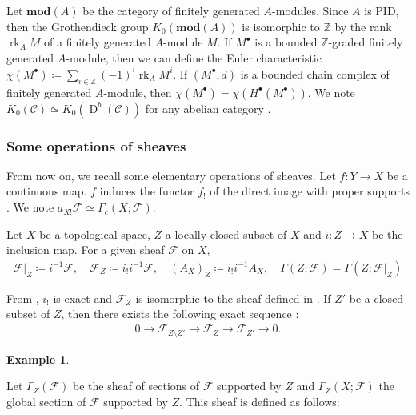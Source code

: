 \documentclass[a4paper,dvipdfmx,reqno,12pt]{amsart}
\theoremstyle{definition}
\newtheorem{example}[theorem]{Example}
\newcommand{\deq}{\coloneqq}
\newcommand{\Z}{\mathbb{Z}}%
\newcommand{\mcal}[1]{\mathcal{#1}}%
\newcommand{\opn}[1]{\operatorname{#1}}
\newcommand{\catn}[1]{\mathbf{#1}}
\numberwithin{equation}{section}
\begin{document}
Let $\catn{mod}(A)$ be the category of 
finitely generated $A$-modules.
Since $A$ is PID, then the Grothendieck group 
$K_0(\catn{mod}(A))$ is isomorphic to $\Z$ by
the rank $\opn{rk}_A M$ of a finitely generated
$A$-module $M$.
If $M^{\bullet}$ is a bounded $\Z$-graded finitely generated $A$-module,
then we can define the Euler characteristic 
$\chi(M^{\bullet})\deq 
\sum_{i\in \Z}(-1)^{i}\opn{rk}_A M^{i}$.
If $(M^{\bullet},d)$ is a bounded chain complex of finitely 
generated $A$-module, then 
$\chi(M^{\bullet})=\chi(H^{\bullet}(M^{\bullet}))$.
We note $K_0(\mathcal{C})\simeq 
K_0(\opn{D}^{b}(\mathcal{C}))$ for any abelian category 
\cite[Exercise I.27]{MR1299726}.

\subsubsection{Some operations of sheaves}

From now on, we recall some elementary 
operations of sheaves. 
Let $f\colon Y\to X$ be a continuous map.
$f$ induces the functor $f_!$ of
the direct image with proper supports 
\cite[(2.5.1)]{MR1299726}. 
We note $a_{X!}\mathcal{F}\simeq \Gamma_c(X;\mathcal{F})$.

Let $X$ be a topological space, $Z$ a locally closed 
subset of $X$
and $i\colon Z\to X$ be the inclusion map.
For a given sheaf $\mathcal{F}$ on $X$, 
\begin{align}
\mcal{F}|_{Z}\deq i^{-1}\mcal{F}, \quad 
\mcal{F}_Z\deq i_! i^{-1}\mcal{F}, \quad 
(A_X)_Z\deq i_!i^{-1}A_X, \quad \Gamma(Z;\mathcal{F})=\Gamma(Z;\mathcal{F}|_{Z})
\end{align}

From \cite[Proposition 2.5.4]{MR1299726}, $i_!$ is exact 
and $\mcal{F}_Z$ is isomorphic to the sheaf defined in
\cite[p.93]{MR1299726}.
If $Z'$ be a closed subset of $Z$, then
there exists the following exact sequence 
\cite[Proposition 2.3.6.(v)]{MR1299726}:
\begin{align}
0\to \mathcal{F}_{Z\setminus Z'} \to 
\mathcal{F}_Z \to \mathcal{F}_{Z'}\to 0.
\end{align}

\begin{example}

\end{example}

Let $\Gamma_{Z}(\mcal{F})$ be the sheaf of sections of 
$\mcal{F}$ supported by $Z$
\cite[Definition 2.3.8]{MR1299726} and 
$\Gamma_{Z}(X;\mcal{F})$ the global section of 
$\mathcal{F}$ supported by $Z$.
This sheaf is defined as follows:
\end{document}
